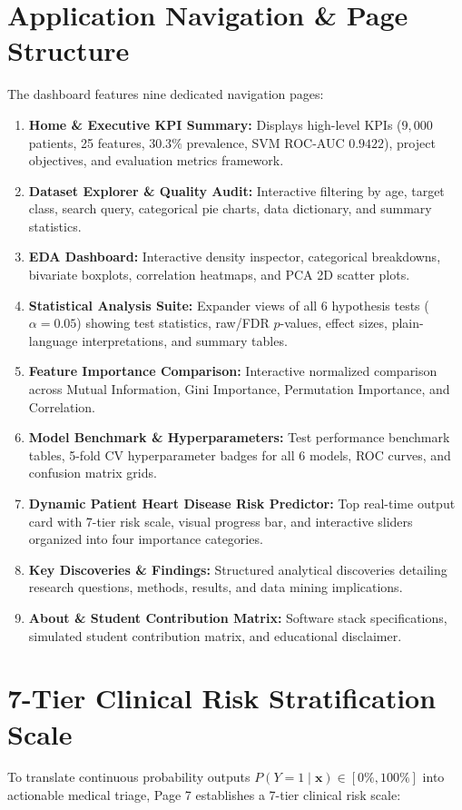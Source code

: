 \section{Application Navigation \& Page Structure}
The dashboard features nine dedicated navigation pages:
\begin{enumerate}
    \item \textbf{Home \& Executive KPI Summary:} Displays high-level KPIs ($9,000$ patients, 25 features, $30.3\%$ prevalence, SVM ROC-AUC $0.9422$), project objectives, and evaluation metrics framework.
    \item \textbf{Dataset Explorer \& Quality Audit:} Interactive filtering by age, target class, search query, categorical pie charts, data dictionary, and summary statistics.
    \item \textbf{EDA Dashboard:} Interactive density inspector, categorical breakdowns, bivariate boxplots, correlation heatmaps, and PCA 2D scatter plots.
    \item \textbf{Statistical Analysis Suite:} Expander views of all 6 hypothesis tests ($\alpha = 0.05$) showing test statistics, raw/FDR $p$-values, effect sizes, plain-language interpretations, and summary tables.
    \item \textbf{Feature Importance Comparison:} Interactive normalized comparison across Mutual Information, Gini Importance, Permutation Importance, and Correlation.
    \item \textbf{Model Benchmark \& Hyperparameters:} Test performance benchmark tables, 5-fold CV hyperparameter badges for all 6 models, ROC curves, and confusion matrix grids.
    \item \textbf{Dynamic Patient Heart Disease Risk Predictor:} Top real-time output card with 7-tier risk scale, visual progress bar, and interactive sliders organized into four importance categories.
    \item \textbf{Key Discoveries \& Findings:} Structured analytical discoveries detailing research questions, methods, results, and data mining implications.
    \item \textbf{About \& Student Contribution Matrix:} Software stack specifications, simulated student contribution matrix, and educational disclaimer.
\end{enumerate}

\section{7-Tier Clinical Risk Stratification Scale}
To translate continuous probability outputs $P(Y=1 \mid \mathbf{x}) \in [0\%, 100\%]$ into actionable medical triage, Page 7 establishes a 7-tier clinical risk scale:

